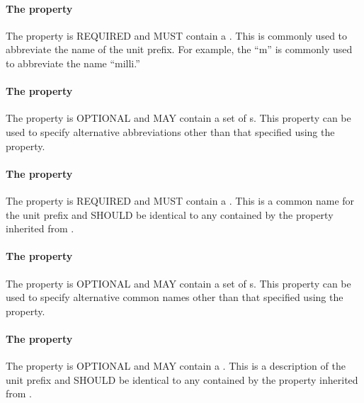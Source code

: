 \paragraph{The  property}\label{sec:symbol:Prefix}
The  property is REQUIRED and MUST contain a . This  is commonly used to abbreviate the name of the unit prefix. For example, the  ``m'' is commonly used to abbreviate the name ``milli.''

\paragraph{The  property}\label{sec:alternativeSymbols:Prefix}
The  property is OPTIONAL and MAY contain a set of s. This property can be used to specify alternative abbreviations other than that specified using the  property.

\paragraph{The  property}\label{sec:label:Prefix}
The  property is REQUIRED and MUST contain a . This  is a common name for the unit prefix and SHOULD be identical to any  contained by the  property inherited from .

\paragraph{The  property}\label{sec:alternativeLabels:Prefix}
The  property is OPTIONAL and MAY contain a set of s. This property can be used to specify alternative common names other than that specified using the  property.

\paragraph{The  property}\label{sec:comment:Prefix}
The  property is OPTIONAL and MAY contain a . This  is a description of the unit prefix and SHOULD be identical to any  contained by the  property inherited from .

